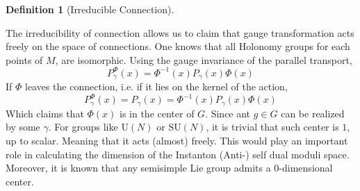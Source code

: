 \documentclass{article}
\newtheorem{defn}{Definition}
\begin{document}
\begin{defn}[Irreducible Connection]
\end{defn}

The irreducibility of connection allows us to claim that gauge transformation acts freely on the space of connections. One knows that all Holonomy groups for each points of $M$, are isomorphic. Using the gauge invariance of the parallel transport,
\[
    P^{\Phi}_\gamma(x) = \Phi^{-1}(x) P_{\gamma}(x) \Phi(x)
\]
If $\Phi$ leaves the connection, i.e. if it lies on the kernel of the action, 
\[
    P^{\Phi}_\gamma(x) = P_\gamma(x) = \Phi^{-1}(x) P_{\gamma}(x) \Phi(x)
\]
Which claims that $\Phi(x)$ is in the center of $G$. Since ant $g\in G$ can be realized by some $\gamma$. For groups like $\mathrm{U}(N)$ or $\mathrm{SU}(N)$, it is trivial that such center is $1$, up to scalar. Meaning that it acts (almost) freely. This would play an important role in calculating the dimension of the Instanton (Anti-) self dual moduli space. Moreover, it is known that any semisimple Lie group admits a 0-dimensional center. 
\end{document}
